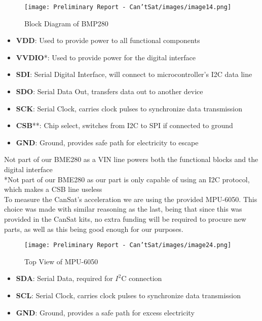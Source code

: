 \documentclass[10pt,twocolumn]{article}
\begin{document}
\begin{figure}[H]
\centering
\texttt{[image: Preliminary Report - Can'tSat/images/image14.png]}  
\caption{\label{fig:BlockDiagram} Block Diagram of BMP280}
\end{figure}


\begin {itemize}
\item \textbf{VDD}: Used to provide power to all functional components
\item \textbf{VVDIO}*: Used to provide power for the digital interface
\item \textbf{SDI}: Serial Digital Interface, will connect to microcontroller’s I2C data line
\item \textbf{SDO}: Serial Data Out, transfers data out to another device
\item \textbf{SCK}: Serial Clock, carries clock pulses to synchronize data transmission
\item \textbf{CSB}**: Chip select, switches from I2C to SPI if connected to ground
\item \textbf{GND}: Ground, provides safe path for electricity to escape
\end {itemize}

\noindent*Not part of our BME280 as a VIN line powers both the functional blocks and the digital interface\\
\noindent**Not part of our BME280 as our part is only capable of using an I2C protocol, which makes a CSB line useless\\

To measure the CanSat’s acceleration we are using the provided MPU-6050. This choice was made with similar reasoning as the last, being that since this was provided in the CanSat kits, no extra funding will be required to procure new parts, as well as this being good enough for our purposes. 

\begin{figure}[H]
\centering
\texttt{[image: Preliminary Report - Can'tSat/images/image24.png]}  
\caption{\label{fig:MPU-6050} Top View of MPU-6050}
\end{figure}


\begin {itemize}
\item \textbf{SDA}: Serial Data, required for $I^2$C connection
\item \textbf{SCL}: Serial Clock, carries clock pulses to synchronize data transmission
\item \textbf{GND}: Ground, provides a safe path for excess electricity
\end {itemize}
\end{document}
